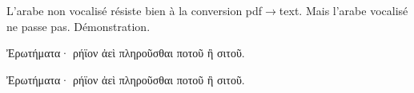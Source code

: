 \documentclass{article}
\begin{document}
L'arabe non vocalisé résiste bien à la conversion
pdf$\rightarrow$text. Mais l'arabe vocalisé ne passe
pas. Démonstration.

\beginnumbering

\pstart
{}
\pend

\pstart
Ἐρωτήματα·  ρήϊον ἀεὶ πληροῦσθαι ποτοῦ ἢ σιτοῦ.
\pend

\pstart
{}
\pend

\pstart
Ἐρωτήματα·  ρήϊον ἀεὶ πληροῦσθαι ποτοῦ ἢ σιτοῦ.
\pend

\endnumbering

\end{document}
